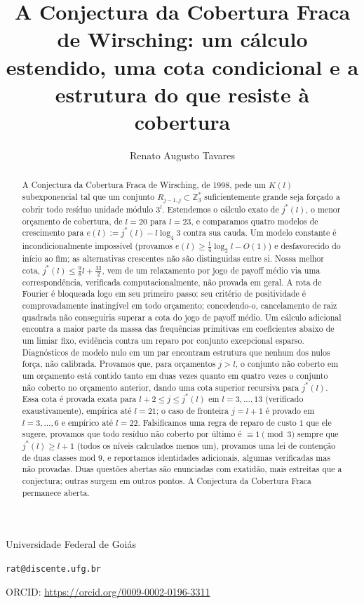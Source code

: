 \documentclass[11pt]{amsart}
\title[A Conjectura da Cobertura Fraca de Wirsching]{A Conjectura da Cobertura Fraca de Wirsching: um
c\'alculo estendido, uma cota condicional e a estrutura do que resiste \`a cobertura}
\author{Renato Augusto Tavares}
\theoremstyle{plain}
\theoremstyle{definition}
\theoremstyle{remark}
\newcommand{\Z}{\mathbb{Z}}
\begin{document}
\maketitle

\vspace{-2.5em}
\begin{center}
\normalsize Universidade Federal de Goi\'as \par
\texttt{rat@discente.ufg.br} \par
ORCID: \url{https://orcid.org/0009-0002-0196-3311}
\end{center}

\begin{abstract}
A Conjectura da Cobertura Fraca de Wirsching, de 1998, pede um $K(l)$ subexponencial tal que um
conjunto $R_{j-1,j}\subset\Z_3^*$ suficientemente grande seja forçado a cobrir todo resíduo unidade
módulo $3^l$. Estendemos o cálculo exato de $j^*(l)$, o menor orçamento de cobertura, de $l=20$
para $l=23$, e comparamos quatro modelos de crescimento para $e(l):=j^*(l)-l\log_4 3$ contra sua
cauda. Um modelo constante é incondicionalmente impossível (provamos $e(l)\ge\tfrac14\log_2l-O(1)$)
e desfavorecido do início ao fim; as alternativas crescentes não são distinguidas entre si. Nossa
melhor cota, $j^*(l)\le\tfrac98l+\tfrac{33}2$, vem de um relaxamento por jogo de payoff médio via
uma correspondência, verificada computacionalmente, não provada em geral. A rota de Fourier é
bloqueada logo em seu primeiro passo: seu critério de positividade é comprovadamente inatingível em
todo orçamento; concedendo-o, cancelamento de raiz quadrada não conseguiria superar a cota do jogo
de payoff médio. Um cálculo adicional encontra a maior parte da massa das frequências primitivas em
coeficientes abaixo de um limiar fixo, evidência contra um reparo por conjunto excepcional esparso.
Diagnósticos de modelo nulo em um par encontram estrutura que nenhum dos nulos força, não
calibrada. Provamos que, para orçamentos $j>l$, o conjunto não coberto em um orçamento está contido
tanto em duas vezes quanto em quatro vezes o conjunto não coberto no orçamento anterior, dando uma
cota superior recursiva para $j^*(l)$. Essa cota é provada exata para $l+2\le j\le j^*(l)$ em
$l=3,\dots,13$ (verificado exaustivamente), empírica até $l=21$; o caso de fronteira $j=l+1$ é
provado em $l=3,\dots,6$ e empírico até $l=22$. Falsificamos uma regra de reparo de custo $1$ que
ele sugere, provamos que todo resíduo não coberto por último é $\equiv1\pmod3$ sempre que
$j^*(l)\ge l+1$ (todos os níveis calculados menos um), provamos uma lei de contenção de duas
classes mod $9$, e reportamos identidades adicionais, algumas verificadas mas não provadas. Duas
questões abertas são enunciadas com exatidão, mais estreitas que a conjectura; outras surgem em
outros pontos. A Conjectura da Cobertura Fraca permanece aberta.
\end{abstract}
\end{document}
